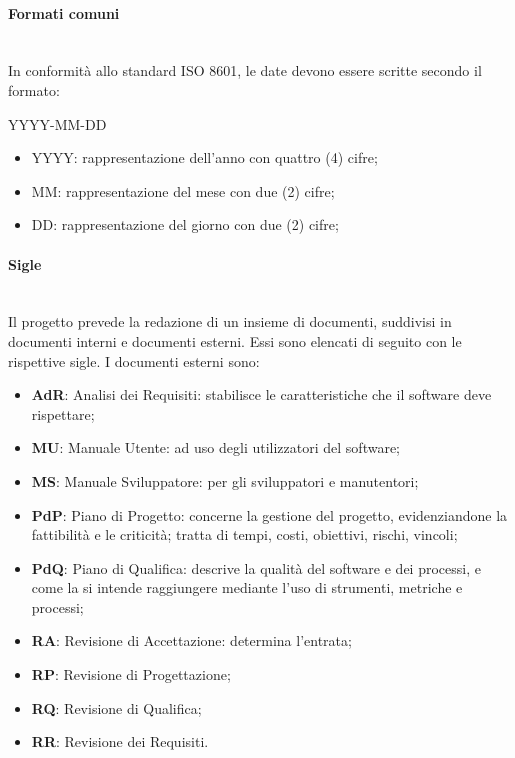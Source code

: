 		\paragraph{Formati comuni} \mbox{}\\
		In conformità allo standard ISO 8601, le date devono essere scritte secondo il formato: \newline
		\centerline{YYYY-MM-DD}
		\begin{itemize}
			\item YYYY: rappresentazione dell'anno con quattro (4) cifre;
			\item MM: rappresentazione del mese con due (2) cifre;
			\item DD: rappresentazione del giorno con due (2) cifre;			
		\end{itemize}
		\paragraph{Sigle} \mbox{}\\
		Il progetto prevede la redazione di un insieme di documenti, suddivisi in documenti interni e documenti esterni. Essi sono elencati di seguito con le rispettive sigle.\newline
		I documenti esterni sono:		
		\begin{itemize}
			\item \textbf{AdR}: Analisi dei Requisiti: stabilisce le caratteristiche che il software deve rispettare;
			\item \textbf{MU}: Manuale Utente: ad uso degli utilizzatori del software;
			\item \textbf{MS}: Manuale Sviluppatore: per gli sviluppatori e manutentori;
			\item \textbf{PdP}: Piano di Progetto: concerne la gestione del progetto, evidenziandone la fattibilità e le criticità; tratta di tempi, costi, obiettivi, rischi, vincoli;
			\item \textbf{PdQ}: Piano di Qualifica: descrive la qualità del software e dei processi, e come la si intende raggiungere mediante l'uso di strumenti, metriche e processi;
			\item \textbf{RA}: Revisione di Accettazione: determina l'entrata;
			\item \textbf{RP}: Revisione di Progettazione;
			\item \textbf{RQ}: Revisione di Qualifica;
			\item \textbf{RR}: Revisione dei Requisiti.
		\end{itemize}	
